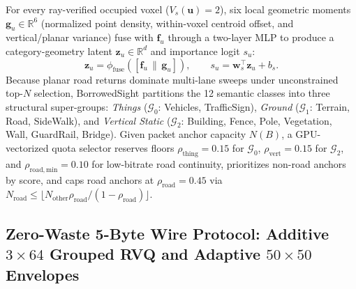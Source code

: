 \documentclass[journal]{IEEEtran}
\begin{document}
For every ray-verified occupied voxel ($V_s(\mathbf{u}) = 2$), six local geometric moments $\mathbf{g}_u \in \mathbb{R}^{6}$ (normalized point density, within-voxel centroid offset, and vertical/planar variance) fuse with $\mathbf{f}_u$ through a two-layer MLP to produce a category-geometry latent $\mathbf{z}_u \in \mathbb{R}^d$ and importance logit $s_u$:
\begin{equation}
\mathbf{z}_u = \phi_{\mathrm{fuse}}\!\left([\mathbf{f}_u \,\|\, \mathbf{g}_u]\right), \qquad s_u = \mathbf{w}_s^\top \mathbf{z}_u + b_s.
\label{eq:geo_fuse}
\end{equation}
Because planar road returns dominate multi-lane sweeps under unconstrained top-$N$ selection, BorrowedSight partitions the 12 semantic classes into three structural super-groups: \textit{Things} ($\mathcal{G}_0$: Vehicles, TrafficSign), \textit{Ground} ($\mathcal{G}_1$: Terrain, Road, SideWalk), and \textit{Vertical Static} ($\mathcal{G}_2$: Building, Fence, Pole, Vegetation, Wall, GuardRail, Bridge). Given packet anchor capacity $N(B)$, a GPU-vectorized quota selector reserves floors $\rho_{\mathrm{thing}} = 0.15$ for $\mathcal{G}_0$, $\rho_{\mathrm{vert}} = 0.15$ for $\mathcal{G}_2$, and $\rho_{\mathrm{road,min}} = 0.10$ for low-bitrate road continuity, prioritizes non-road anchors by score, and caps road anchors at $\rho_{\mathrm{road}} = 0.45$ via $N_{\mathrm{road}} \le \lfloor N_{\mathrm{other}} \rho_{\mathrm{road}} / (1 - \rho_{\mathrm{road}}) \rfloor$.

\subsection{Zero-Waste 5-Byte Wire Protocol: Additive \texorpdfstring{$3\times 64$}{3x64} Grouped RVQ and Adaptive \texorpdfstring{$50\times 50$}{50x50} Envelopes}
\end{document}
